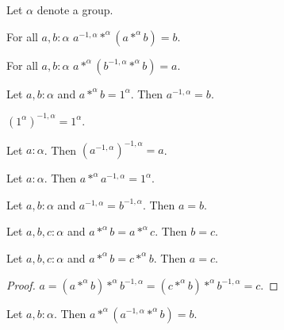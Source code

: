 \documentclass{article}
\begin{document}
\begin{forthel}
Let $\alpha$ denote a group.

\begin{lemma} For all $a,b : \alpha$ 
$a^{-1,\alpha} *^{\alpha} (a *^{\alpha} b) = b$.
\end{lemma}

\begin{lemma} For all $a,b : \alpha$ 
$a *^{\alpha} (b^{-1,\alpha} *^{\alpha} b) = a$.
\end{lemma}

\begin{lemma} Let $a, b : \alpha$ and
$a *^{\alpha} b = 1^{\alpha}$. Then $a^{-1,\alpha} = b$.
\end{lemma}

\begin{lemma} $(1^{\alpha})^{-1,\alpha} = 1^{\alpha}$.
\end{lemma}

\begin{lemma} Let $a : \alpha$. Then 
$(a^{-1,\alpha})^{-1,\alpha} = a$.
\end{lemma}

\begin{lemma} Let $a : \alpha$. Then 
$a *^{\alpha} a^{-1,\alpha} = 1^{\alpha}$.
\end{lemma}

\begin{lemma} Let $a,b : \alpha$ and $a^{-1,\alpha} = b^{-1,\alpha}$.
Then $a = b$.
\end{lemma}

\begin{lemma} Let $a,b,c : \alpha$ and 
$a *^{\alpha} b = a *^{\alpha} c$. Then $b = c$.
\end{lemma}

\begin{lemma} Let $a,b,c : \alpha$ and 
$a *^{\alpha} b = c *^{\alpha} b$. Then $a = c$.
\end{lemma}

\begin{proof} $a = (a *^{\alpha} b) *^{\alpha} b^{-1,\alpha}
= (c *^{\alpha} b) *^{\alpha} b^{-1,\alpha} = c$.
\end{proof}

\begin{lemma} Let $a,b : \alpha$. Then 
$a *^{\alpha} (a^{-1,\alpha} *^{\alpha} b) = b$.
\end{lemma}


\end{forthel}
\end{document}
